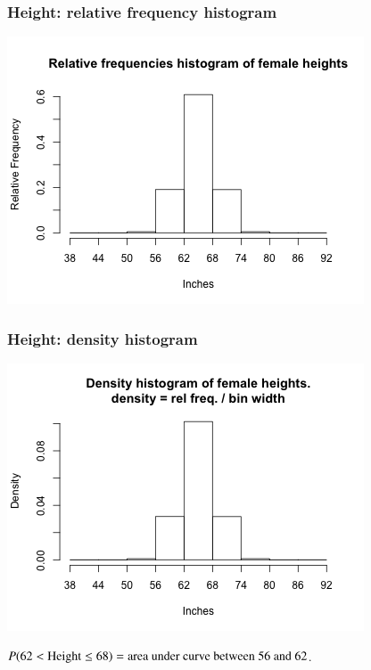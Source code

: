 \documentclass[slidestop,compress,mathserif,12pt,t,professionalfonts,xcolor=table]{beamer}
\begin{document}
\begin{frame}
  \frametitle{Height: relative frequency histogram}

  \begin{center}
    \includegraphics[scale=0.7]{figures/relfreq-histogram-6.png}
    \end{center}

\end{frame}

\begin{frame}
  \frametitle{Height: density histogram}

  \begin{center}
    \includegraphics[scale=0.7]{figures/density-histogram-6.png}
    \end{center}

    $P(62 < \textmd{Height} \leq 68) = \textmd{area under curve between 56 and 62}$.

\end{frame}
\end{document}
